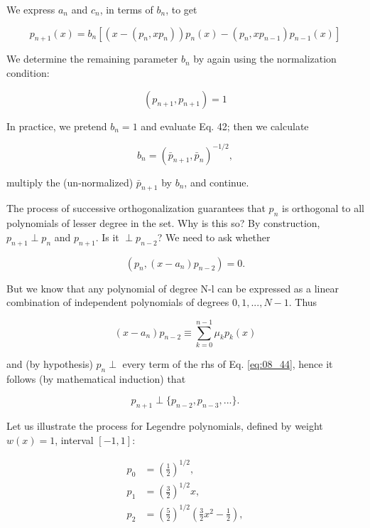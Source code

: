 We express $a_{n}$ and $c_{n}$, in terms of $b_{n}$, to get

\begin{equation}
p_{n+1}(x) = b_{n} \left[ (x - (p_{n}, xp_{n})) p_{n}(x) - (p_{n} , x p_{n-1})p_{n-1}(x) \right]
\end{equation}

We determine the remaining parameter $b_{n}$ by again using the normalization condition:

\begin{equation*}
(p_{n+1} , p_{n+1}) = 1
\end{equation*}

In practice, we pretend $b_{n}=1$ and evaluate Eq. 42; then we calculate

\begin{equation}
b_{n} = ( \bar{p}_{n+1}, \bar{p}_{n})^{-1/2},
\end{equation}

multiply the (un-normalized) $\bar{p}_{n+1}$ by $b_{n}$, and continue.

The process of successive orthogonalization guarantees that $p_{n}$ is orthogonal to all polynomials of lesser degree in the set. Why is this so? By construction, $p_{n+1} \perp p_{n}$ and $p_{n+1}$. Is it $\perp p_{n-2}$? We need to ask whether

\begin{equation*}
(p_{n}, (x-a_{n})p_{n-2}) = 0.
\end{equation*}

But we know that any polynomial of degree N-l can be expressed as a linear combination of independent polynomials of degrees $0, 1, ... , N-1$. Thus

\begin{equation}\label{eq:08_44}
(x - a_{n}) p_{n-2} \equiv \sum_{k=0}^{n-1} \mu_{k} p_{k}(x)
\end{equation}

and (by hypothesis) $p_{n} \perp$ every term of the rhs of Eq. \ref{eq:08_44}, hence it follows (by mathematical induction) that

\begin{equation}
p_{n+1} \perp \{ p_{n-2} , p_{n-3} , ... \}.
\end{equation}

Let us illustrate the process for Legendre polynomials, defined by weight $w(x) = 1$, interval $[-1,1]$:

\begin{align*}
p_{0} & = (\frac{1}{2})^{1/2} , \\
p_{1} & = (\frac{3}{2})^{1/2} x , \\
p_{2} & = (\frac{5}{2})^{1/2} (\frac{3}{2}x^{2} - \frac{1}{2}) ,
\end{align*}

